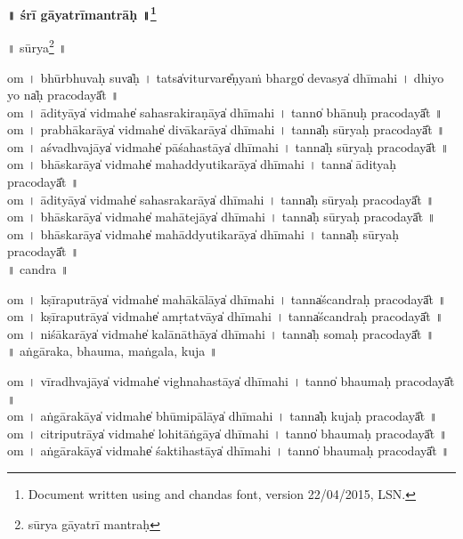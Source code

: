 \documentclass[parskip, DIV=14]{scrartcl}
\renewcommand{\thefootnote}{\fnsymbol{footnote}} %
\begin{document}

\vspace{-1.5cm}

\begin{center}
\textbf{{\Huge\vspace{0.201cm} ॥  śrī gā॒yatrīmantrāḥ॒ ॥\LARGE\let\thefootnote\relax\footnote{\color{lightgray} Document written using \XeLaTeX{} and chandas font, version 22/04/2015, LSN.}}}
\end{center}
\Large


\vspace{1.001cm} 

॥   sūrya\footnote{\color{lightgray} sūrya gāyatrī mantraḥ}  ॥\par
  om  । bhūrbhuva॒ḥ suva̍ḥ । tatsa̍vi॒turvare̎ṇya॒ṁ bhargo̍ de॒vasya̍ dhīmahi  ।  dhiyo॒ yo na̍ḥ praco॒dayā̎t ॥ \\
  om  । ā॒di॒tyāya̍ vi॒dmahe̍ sahasrakira॒ṇāya̍ dhīmahi  ।  tanno̍ bhānuḥ praco॒dayā̎t ॥ \\
  om  । pra॒bhā॒ka॒rāya̍ vi॒dmahe̍ divāka॒rāya̍ dhīmahi  ।  tanna̍ḥ sūryaḥ praco॒dayā̎t ॥ \\
  om  । a॒śva॒dhva॒jāya̍ vi॒dmahe̍ pāśaha॒stāya̍ dhīmahi  ।  tanna̍ḥ sūryaḥ praco॒dayā̎t ॥ \\
  om  । bhā॒ska॒rāya̍ vi॒dmahe̍ mahaddyutika॒rāya̍ dhīmahi  ।  tanna̍ ādityaḥ praco॒dayā̎t ॥ \\
  om  । ā॒di॒tyāya̍ vi॒dmahe̍ sahasraka॒rāya̍ dhīmahi  ।  tanna̍ḥ sūryaḥ praco॒dayā̎t ॥ \\
  om  । bhā॒ska॒rāya̍ vi॒dmahe̍ mahāte॒jāya̍ dhīmahi  ।  tanna̍ḥ sūryaḥ praco॒dayā̎t ॥ \\
  om  । bhā॒ska॒rāya̍ vi॒dmahe̍ mahāddyutika॒rāya̍ dhīmahi  ।  tanna̍ḥ sūryaḥ praco॒dayā̎t ॥ \\

\vspace{0.201cm} ॥   candra  ॥ \par
  om  । kṣī॒ra॒pu॒trāya̍ vi॒dmahe̍ mahākā॒lāya̍ dhīmahi  ।  tanna̍ścandraḥ praco॒dayā̎t ॥ \\
  om  । kṣī॒ra॒pu॒trāya̍ vi॒dmahe̍ amṛta॒tvāya̍ dhīmahi  ।  tanna̍ścandraḥ praco॒dayā̎t ॥ \\
  om  । ni॒śā॒ka॒rāya̍ vi॒dmahe̍ kalānā॒thāya̍ dhīmahi  ।  tanna̍ḥ somaḥ praco॒dayā̎t ॥ \\  

\vspace{0.201cm} ॥   aṅgāraka, bhauma, maṅgala, kuja  ॥ \par
  om  । vī॒ra॒dhva॒jāya̍ vi॒dmahe̍ vighnaha॒stāya̍ dhīmahi  ।  tanno̍ bhaumaḥ praco॒dayā̎t ॥ \\
  om  । a॒ṅgā॒ra॒kāya̍ vi॒dmahe̍ bhūmipā॒lāya̍ dhīmahi  ।  tanna̍ḥ kujaḥ praco॒dayā̎t ॥ \\
  om  । ci॒tri॒pu॒trāya̍ vi॒dmahe̍ lohitā॒ṅgāya̍ dhīmahi  ।  tanno̍ bhaumaḥ praco॒dayā̎t ॥ \\
  om  । a॒ṅgā॒ra॒kāya̍ vi॒dmahe̍ śaktiha॒stāya̍ dhīmahi  ।  tanno̍ bhaumaḥ praco॒dayā̎t ॥ \\ 
\end{document}
